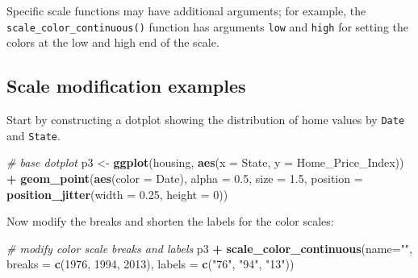 \documentclass[
]{book}
\newenvironment{Shaded}{\begin{snugshade}}{\end{snugshade}}
\newcommand{\CommentTok}[1]{\textcolor[rgb]{0.56,0.35,0.01}{\textit{#1}}}
\newcommand{\DataTypeTok}[1]{\textcolor[rgb]{0.13,0.29,0.53}{#1}}
\newcommand{\DecValTok}[1]{\textcolor[rgb]{0.00,0.00,0.81}{#1}}
\newcommand{\FloatTok}[1]{\textcolor[rgb]{0.00,0.00,0.81}{#1}}
\newcommand{\KeywordTok}[1]{\textcolor[rgb]{0.13,0.29,0.53}{\textbf{#1}}}
\newcommand{\NormalTok}[1]{#1}
\newcommand{\OperatorTok}[1]{\textcolor[rgb]{0.81,0.36,0.00}{\textbf{#1}}}
\newcommand{\StringTok}[1]{\textcolor[rgb]{0.31,0.60,0.02}{#1}}
\begin{document}
Specific scale functions may have additional arguments; for example, the \texttt{scale\_color\_continuous()} function has arguments \texttt{low} and \texttt{high} for setting the colors at the low and high end of the scale.

\hypertarget{scale-modification-examples}{%
\subsection{Scale modification examples}\label{scale-modification-examples}}

Start by constructing a dotplot showing the distribution of home values by \texttt{Date} and \texttt{State}.

\begin{Shaded}
\begin{Highlighting}[]
\CommentTok{\# base dotplot}
\NormalTok{p3 \textless{}{-}}\StringTok{ }\KeywordTok{ggplot}\NormalTok{(housing, }\KeywordTok{aes}\NormalTok{(}\DataTypeTok{x =}\NormalTok{ State, }\DataTypeTok{y =}\NormalTok{ Home\_Price\_Index)) }\OperatorTok{+}\StringTok{ }
\StringTok{    }\KeywordTok{geom\_point}\NormalTok{(}\KeywordTok{aes}\NormalTok{(}\DataTypeTok{color =}\NormalTok{ Date), }\DataTypeTok{alpha =} \FloatTok{0.5}\NormalTok{, }\DataTypeTok{size =} \FloatTok{1.5}\NormalTok{,}
               \DataTypeTok{position =} \KeywordTok{position\_jitter}\NormalTok{(}\DataTypeTok{width =} \FloatTok{0.25}\NormalTok{, }\DataTypeTok{height =} \DecValTok{0}\NormalTok{))}
\end{Highlighting}
\end{Shaded}

Now modify the breaks and shorten the labels for the color scales:

\begin{Shaded}
\begin{Highlighting}[]
\CommentTok{\# modify color scale breaks and labels}
\NormalTok{p3 }\OperatorTok{+}\StringTok{ }
\StringTok{  }\KeywordTok{scale\_color\_continuous}\NormalTok{(}\DataTypeTok{name=}\StringTok{""}\NormalTok{,}
                         \DataTypeTok{breaks =} \KeywordTok{c}\NormalTok{(}\DecValTok{1976}\NormalTok{, }\DecValTok{1994}\NormalTok{, }\DecValTok{2013}\NormalTok{),}
                         \DataTypeTok{labels =} \KeywordTok{c}\NormalTok{(}\StringTok{"\textquotesingle{}76"}\NormalTok{, }\StringTok{"\textquotesingle{}94"}\NormalTok{, }\StringTok{"\textquotesingle{}13"}\NormalTok{))}
\end{Highlighting}
\end{Shaded}
\end{document}
